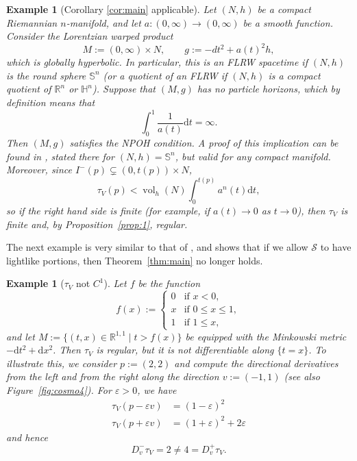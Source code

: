\documentclass[a4paper,11pt]{amsart}
\newtheorem{example}[theorem]{{Example}}%
\newcommand{\R}{\mathbb{R}}
\newcommand{\dd}{\mathrm{d}}
\newcommand{\CS}{\mathcal{S}}
\newcommand{\df}{\mathrm{d}}
\begin{document}
\begin{example}[Corollary \ref{cor:main} applicable] \label{ex:flrw}
 Let $(N,h)$ be a compact Riemannian $n$-manifold, and let $a \colon (0,\infty) \to (0,\infty)$ be a smooth function. Consider the Lorentzian warped product
 \begin{equation*}
     M := (0,\infty) \times N, \qquad g := -dt^2 + a(t)^2 h,
 \end{equation*}
 which is globally hyperbolic. In particular, this is an FLRW spacetime if $(N,h)$ is the round sphere $\mathbb{S}^n$ (or a quotient of an FLRW if $(N,h)$ is a compact quotient of $\R^n$ or $\mathbb{H}^n$). Suppose that $(M,g)$ has no particle horizons, which by definition means that
 \begin{equation*}
     \int_0^1 \frac{1}{a(t)} \dd t = \infty.
 \end{equation*}
 Then $(M,g)$ satisfies the NPOH condition. A proof of this implication can be found in \cite[Prop.~3.6]{Sbi25}, stated there for $(N,h) = \mathbb{S}^n$, but valid for any compact manifold. Moreover, since $I^-(p) \subsetneq (0,t(p)) \times N$,
 \begin{equation*}
     \tau_V(p) <  \operatorname{vol}_h(N) \int_0^{t(p)} a^n(t) \dd t,
 \end{equation*}
 so if the right hand side is finite (for example, if $a(t) \to 0$ as $t \to 0$), then $\tau_V$ is finite and, by Proposition~\ref{prop:1}, regular.
\end{example}

The next example is very similar to that of \cite[Fig.~1]{CGM16}, and shows that if we allow $\CS$ to have lightlike portions, then Theorem~\ref{thm:main} no longer holds.

\begin{example}[$\tau_V$ not $C^1$] \label{ex:vol}
 Let $f$ be the function
 \begin{equation*}
  f(x) := \begin{cases}
        0 &\text{if } x < 0,\\
        x &\text{if } 0 \leq x \leq 1,\\
        1 &\text{if } 1 \leq x,
       \end{cases}
 \end{equation*}
 and let $M := \{ (t,x) \in \R^{1,1} \mid t > f(x) \}$ be equipped with the Minkowski metric $-\df t^2 + \df x^2$. Then $\tau_V$ is regular, but it is not differentiable along $\{t=x\}$. To illustrate this, we consider $p := (2,2)$ and compute the directional derivatives from the left and from the right along the direction $v := (-1,1)$ (see also Figure~\ref{fig:cosmo4}). For $\varepsilon > 0$, we have
 \begin{align*}
  \tau_V (p - \varepsilon v) &= (1-\varepsilon)^2 \\
  \tau_V (p + \varepsilon v) &= (1+\varepsilon)^2 + 2\varepsilon
 \end{align*}
 and hence
 \begin{equation*}
  D^-_{v} \tau_V = 2 \neq 4 = D^+_v \tau_V.
 \end{equation*}
\end{example}
\end{document}
